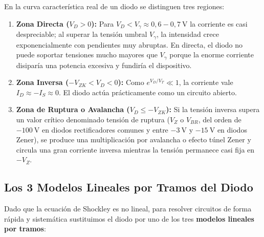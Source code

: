 En la curva característica real de un diodo se distinguen tres regiones:
\begin{enumerate}[leftmargin=*]
    \item \textbf{Zona Directa ($V_D > 0$):} Para $V_D < V_\gamma \approx 0{,}6 - 0{,}7\ \si{\volt}$ la corriente es casi despreciable; al superar la tensión umbral $V_\gamma$, la intensidad crece exponencialmente con pendientes muy abruptas. En directa, el diodo no puede soportar tensiones mucho mayores que $V_\gamma$ porque la enorme corriente disiparía una potencia excesiva y fundiría el dispositivo.
    \item \textbf{Zona Inversa ($-V_{ZK} < V_D < 0$):} Como $e^{V_D/V_T} \ll 1$, la corriente vale $I_D \approx -I_S \approx 0$. El diodo actúa prácticamente como un circuito abierto.
    \item \textbf{Zona de Ruptura o Avalancha ($V_D \le -V_{ZK}$):} Si la tensión inversa supera un valor crítico denominado tensión de ruptura ($V_Z$ o $V_{BR}$, del orden de $-100\ \si{\volt}$ en diodos rectificadores comunes y entre $-3\ \si{\volt}$ y $-15\ \si{\volt}$ en diodos Zener), se produce una multiplicación por avalancha o efecto túnel Zener y circula una gran corriente inversa mientras la tensión permanece casi fija en $-V_Z$.
\end{enumerate}

\begin{center}
\end{center}

\subsection{Los 3 Modelos Lineales por Tramos del Diodo}
Dado que la ecuación de Shockley es no lineal, para resolver circuitos de forma rápida y sistemática sustituimos el diodo por uno de los tres \textbf{modelos lineales por tramos}:

